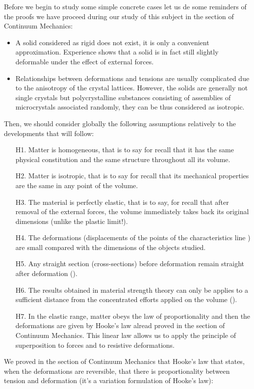 	Before we begin to study some simple concrete cases let us de some reminders of the proofs we have proceed during our study of this subject in the section of Continuum Mechanics:
	\begin{itemize}
		\item A solid considered as rigid does not exist, it is only a convenient approximation. Experience shows that a solid is in fact still slightly deformable under the effect of external forces.

		\item Relationships between deformations and tensions are usually complicated due to the anisotropy of the crystal lattices. However, the solids are generally not single crystals but polycrystalline substances consisting of assemblies of microcrystals associated randomly, they can be thus considered as isotropic.
	\end{itemize}
	Then, we should consider globally the following assumptions relatively to the developments that will follow:
	\begin{itemize}
		\item[H1.] Matter is homogeneous, that is to say for recall that it has the same physical constitution and the same structure throughout all its volume.

		\item[H2.] Matter is isotropic, that is to say for recall that its mechanical properties are the same in any point of the volume.

		\item[H3.] The material is perfectly elastic, that is to say, for recall that after removal of the external forces, the volume immediately takes back its original dimensions (unlike the plastic limit!).

		\item[H4.] The deformations (displacements of the points of the characteristics line ) are small compared with the dimensions of the objects studied.

		\item[H5.] Any straight section (cross-sections) before deformation remain straight after deformation ().

		\item[H6.] The results obtained in material strength theory can only be applies to a sufficient distance from the concentrated efforts applied on the volume ().

		\item[H7.] In the elastic range, matter obeys the law of proportionality and then the deformations are given by Hooke's law alread proved in the section of Continuum Mechanics. This linear law allows us to apply the principle of superposition to forces and to resistive deformations.
	\end{itemize}
	We proved in the section of Continuum Mechanics that Hooke's law that states, when the deformations are reversible, that there is proportionality between tension and deformation (it's a variation formulation of Hooke's law):
	
